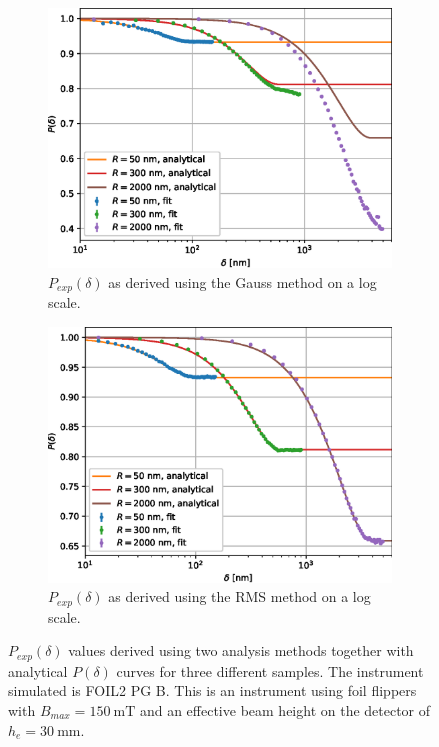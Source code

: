\documentclass[]{article}
\begin{document}
	\begin{figure}[p]
		\centering
		\begin{subfigure}[b]{0.95\textwidth}
			\centering
			\includegraphics[width=\textwidth]{simulation-plot-gauss-FOIL2-PG-B-log}
			\caption{$P_{exp}(\delta)$ as derived using the Gauss method on a log scale.}
			\label{fig:simulation-plot-gauss-FOIL2-PG-B-log}
		\end{subfigure}
		\hfill
		\centering
		\begin{subfigure}[b]{0.95\textwidth}
			\centering
			\includegraphics[width=\textwidth]{simulation-plot-rms-FOIL2-PG-B-log}
			\caption{$P_{exp}(\delta)$ as derived using the RMS method on a log scale.}
			\label{fig:simulation-plot-rms-FOIL2-PG-B-log}
		\end{subfigure}
		\hfill
		\caption{$P_{exp}(\delta)$ values derived using two analysis methods together with analytical $P(\delta)$ curves for three different samples. The instrument simulated is FOIL2 PG B. This is an instrument using foil flippers with $B_{max} = \SI{150}{\milli\tesla}$ and an effective beam height on the detector of $h_e = \SI{30}{\milli\meter}$. }
		\label{fig:simulation-plot-FOIL2-PG-B-log}
	\end{figure}
	
\end{document}
